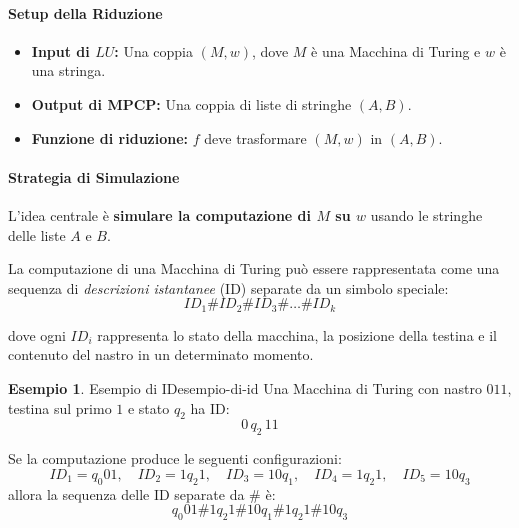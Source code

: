 \documentclass[a4paper]{article}
\theoremstyle{definition} %
\newtheorem{example}{Esempio}
\newcommand{\blankS}{\ensuremath{\raisebox{-0.15ex}{\scalebox{1.3}[0.7]{$\sqcup$}}\mkern2mu}}
\theoremstyle{remark} %
\begin{document}
\paragraph{Setup della Riduzione}
\begin{itemize}
    \item \textbf{Input di $LU$:} Una coppia $(M, w)$, dove $M$ è una Macchina di Turing e $w$ è una stringa.
    \item \textbf{Output di MPCP:} Una coppia di liste di stringhe $(A, B)$.
    \item \textbf{Funzione di riduzione:} $f$ deve trasformare $(M, w)$ in $(A, B)$.
\end{itemize}

\paragraph{Strategia di Simulazione}
L'idea centrale è \textbf{simulare la computazione di $M$ su $w$} usando le stringhe delle liste $A$ e $B$. 

La computazione di una Macchina di Turing può essere rappresentata come una sequenza di \emph{descrizioni istantanee} (ID) separate da un simbolo speciale:
$$ID_1 \# ID_2 \# ID_3 \# \dots \# ID_k$$

dove ogni $ID_i$ rappresenta lo stato della macchina, la posizione della testina e il contenuto del nastro in un determinato momento.

\begin{example}{Esempio di ID}{esempio-di-id}
Una Macchina di Turing con nastro $011$, testina sul primo $1$ e stato $q_2$ ha ID:
\[
0\,q_2\,11
\]
\vspace{-1em}
\begin{center}
\end{center}

Se la computazione produce le seguenti configurazioni:
\[
ID_1 = q_0 01,\quad
ID_2 = 1q_2 1,\quad
ID_3 = 10q_1,\quad
ID_4 = 1q_2 1,\quad
ID_5 = 10q_3
\]
allora la sequenza delle ID separate da \# è:
\[
q_0 01 \# 1q_2 1 \# 10q_1 \# 1q_2 1 \# 10q_3
\]
\end{example}
\end{document}

